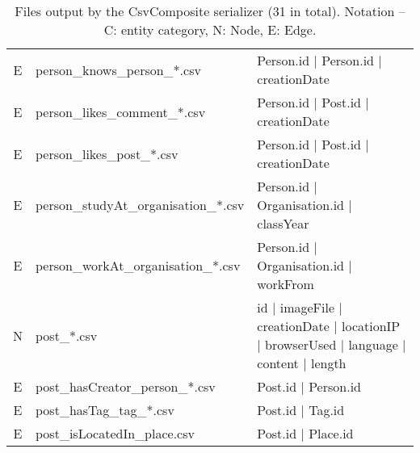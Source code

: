 \begin{table}[htb]
\begin{tabular}{|c|p{4.6cm}|p{11.4cm}|}
        E                       & person\_knows\_person\_*.csv            & Person.id | Person.id | creationDate                                                                        \\
        E                       & person\_likes\_comment\_*.csv           & Person.id | Post.id | creationDate                                                                          \\
        E                       & person\_likes\_post\_*.csv              & Person.id | Post.id | creationDate                                                                          \\
        E                       & person\_studyAt\_organisation\_*.csv    & Person.id | Organisation.id | classYear                                                                     \\
        E                       & person\_workAt\_organisation\_*.csv     & Person.id | Organisation.id | workFrom                                                                      \\
		\hline
        N                       & post\_*.csv                             & id | imageFile | creationDate | locationIP | browserUsed | language | content | length                      \\
        E                       & post\_hasCreator\_person\_*.csv         & Post.id | Person.id                                                                                         \\
        E                       & post\_hasTag\_tag\_*.csv                & Post.id | Tag.id                                                                                            \\
        E                       & post\_isLocatedIn\_place.csv            & Post.id | Place.id                                                                                          \\
        \hline
    \end{tabular}
    \caption{Files output by the CsvComposite serializer (31 in total). Notation -- C: entity category, N: Node, E: Edge.}
    \label{table:csv_composite}
\end{table}
